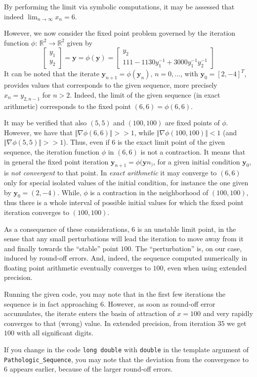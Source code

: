 \documentclass{article}
\begin{document}
    By performing the limit via symbolic computations, it may be
    assessed that indeed $\lim_{n\to\infty} x_n=6$.

    However, we now consider the fixed point problem governed by the
    iteration function $\phi:\,\mathbb{R}^2\to\mathbb{R}^2$ given by
    \[
      \begin{bmatrix}
        y_1\\y_2 \end{bmatrix}=\mathbf{y}=\phi(\mathbf{y})=\begin{bmatrix}
        y_2\\
        111-1130y^{-1}_1+3000y^{-1}_{1}y^{-1}_{2}
        \end{bmatrix}
    \]
    It can be noted that the iterate
    $\mathbf{y}_{n+1}=\phi(\mathbf{y}_{n}),\, n=0,\ldots$, with
    $\mathbf{y}_0=[2,-4]^T$, provides values that corresponds to the
    given sequence, more precisely $x_n=y_{2,n-1}$ for $n>2$. Indeed,
    the limit of the given sequence (in exact arithmetic) corresponds
    to the fixed point $(6,6)=\phi(6,6)$.
    
    It may be verified that also $(5,5)$ and $(100,100)$ are fixed
    points of $\phi$. However, we have that
    $\Vert\nabla\phi(6,6)\Vert>>1$, while
    $\Vert\nabla\phi(100,100)\Vert<1$ (and
    $\Vert\nabla\phi(5,5)\Vert>>1$). Thus, even if $6$ is the exact
    limit point of the given sequence, the iteration function $\phi$
    in $(6,6)$ is not a contraction. It means that in general the
    fixed point iteration $\mathbf{y}_{n+1}=\phi(\mathbf{y}n_)$, for a
    given initial condition $\mathbf{y}_0$, is \emph{not convergent} to that
    point.  In \emph{exact arithmetic} it may converge to $(6,6)$ only
    for special isolated values of the initial condition, for instance
    the one given by $\mathbf{y}_0=(2,-4)$.  While, $\phi$ is a
    contraction in the neighborhood of $(100,100)$, thus there is a
    whole interval of possible initial values for which the fixed
    point iteration converges to $(100,100)$.

    As a consequence of these considerations, $6$ is an unstable limit
    point, in the sense that any small perturbations will lead the
    iteration to move away from it and finally towards the ``stable''
    point $100$. The ``perturbation'' is, on our case, induced by
    round-off errors. And, indeed, the sequence computed numerically
    in floating point arithmetic eventually converges to $100$, even
    when using extended precision.

    Running the given code, you may note that in the first few
    iterations the sequence is in fact approaching $6$. However, as
    soon as round-off error accumulates, the iterate enters the basin
    of attraction of $x=100$ and very rapidly converges to that
    (wrong) value. In extended precision, from iteration $35$ we get
    $100$ with all significant digits.

    If you change in the code \texttt{long double} with
    \texttt{double} in the template argument of
    \texttt{Pathologic\_Sequence}, you may note that the deviation
    from the convergence to $6$ appears earlier, because of the larger
    round-off errors.
 
\end{document}

